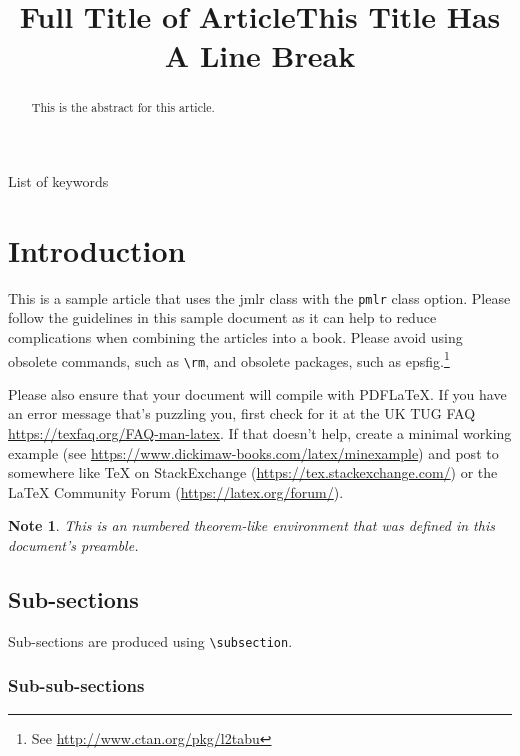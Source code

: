 \documentclass[mlabstract]{jmlr}
\title[Short Title]{Full Title of Article\titlebreak This Title Has
A Line Break\titletag{\thanks{sample footnote}}}
\newtheorem*{note}{Note}
\begin{document}
\maketitle

\begin{abstract}
This is the abstract for this article.
\end{abstract}
\begin{keywords}
List of keywords
\end{keywords}

\section{Introduction}
\label{sec:intro}

This is a sample article that uses the \textsf{jmlr} class with
the \texttt{pmlr} class option.  Please follow the guidelines in
this sample document as it can help to reduce complications when
combining the articles into a book. Please avoid using obsolete
commands, such as \verb|\rm|, and obsolete packages, such as
\textsf{epsfig}.\footnote{See
\url{http://www.ctan.org/pkg/l2tabu}}

Please also ensure that your document will compile with PDF\LaTeX.
If you have an error message that's puzzling you, first check for it
at the UK TUG FAQ
\url{https://texfaq.org/FAQ-man-latex}.  If
that doesn't help, create a minimal working example (see
\url{https://www.dickimaw-books.com/latex/minexample}) and post
to somewhere like TeX on StackExchange
(\url{https://tex.stackexchange.com/}) or the LaTeX Community Forum
(\url{https://latex.org/forum/}).

\begin{note}
This is an numbered theorem-like environment that was defined in
this document's preamble.
\end{note}

\subsection{Sub-sections}

Sub-sections are produced using \verb|\subsection|.

\subsubsection{Sub-sub-sections}
\end{document}
